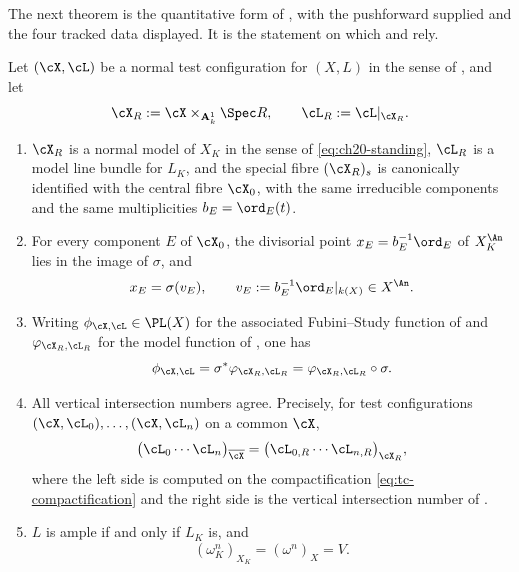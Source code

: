 The next theorem is the quantitative form of
, with the pushforward supplied and the
four tracked data displayed.  It is the statement on which
 and  rely.

\begin{theorem}
\label{thm:ch30-gauss-model-dictionary}
Let \((\cX,\cL)\) be a normal test configuration for \((X,L)\) in the sense
of , and let
\[
 \cX_R:=\cX\times_{\mathbf A^1_k}\Spec R,
 \qquad
 \cL_R:=\cL|_{\cX_R} .
\]
\begin{enumerate}
\item\label{itm:ch30-gmd:model}
\(\cX_R\) is a normal model of \(X_K\) in the sense of
\eqref{eq:ch20-standing}, \(\cL_R\) is a model line bundle for \(L_K\), and
the special fibre \((\cX_R)_s\) is canonically identified with the central
fibre \(\cX_0\), with the same irreducible components and the same
multiplicities \(b_E=\ord_E(t)\).
\item\label{itm:ch30-gmd:points}
For every component \(E\) of \(\cX_0\), the divisorial point
\(x_E=b_E^{-1}\ord_E\) of \(X_K^{\An}\) lies in the image of \(\sigma\), and
\begin{equation}
\label{eq:ch30-gauss-divisorial}
 x_E=\sigma(v_E),
 \qquad v_E:=b_E^{-1}\ord_E|_{k(X)}\in X^{\An} .
\end{equation}
\item\label{itm:ch30-gmd:function}
Writing \(\phi_{\cX,\cL}\in\PL(X)\) for the associated Fubini--Study
function of  and \(\varphi_{\cX_R,\cL_R}\) for the
model function of , one has
\begin{equation}
\label{eq:ch30-gauss-pl}
 \phi_{\cX,\cL}=\sigma^*\varphi_{\cX_R,\cL_R}
 =\varphi_{\cX_R,\cL_R}\circ\sigma .
\end{equation}
\item\label{itm:ch30-gmd:intersections}
All vertical intersection numbers agree.  Precisely, for test
configurations \((\cX,\cL_0),\ldots,(\cX,\cL_n)\) on a common \(\cX\),
\begin{equation}
\label{eq:ch30-gauss-intersection}
 \bigl(\cL_0\cdots\cL_n\bigr)_{\overline\cX}
 =\bigl(\cL_{0,R}\cdots\cL_{n,R}\bigr)_{\cX_R},
\end{equation}
where the left side is computed on the compactification
\eqref{eq:tc-compactification} and the right side is the vertical
intersection number of .
\item\label{itm:ch30-gmd:class}
\(L\) is ample if and only if \(L_K\) is, and
\begin{equation}
\label{eq:ch30-gauss-volume}
 (\omega_K^n)_{X_K}=(\omega^n)_X=V .
\end{equation}
\end{enumerate}
\end{theorem}

